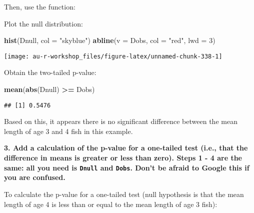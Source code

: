 \documentclass[]{book}
\newenvironment{Shaded}{\begin{snugshade}}{\end{snugshade}}
\newcommand{\KeywordTok}[1]{\textcolor[rgb]{0.13,0.29,0.53}{\textbf{#1}}}
\newcommand{\DataTypeTok}[1]{\textcolor[rgb]{0.13,0.29,0.53}{#1}}
\newcommand{\DecValTok}[1]{\textcolor[rgb]{0.00,0.00,0.81}{#1}}
\newcommand{\StringTok}[1]{\textcolor[rgb]{0.31,0.60,0.02}{#1}}
\newcommand{\OperatorTok}[1]{\textcolor[rgb]{0.81,0.36,0.00}{\textbf{#1}}}
\newcommand{\NormalTok}[1]{#1}
\theoremstyle{definition}
\theoremstyle{definition}
\theoremstyle{definition}
\theoremstyle{remark}
\begin{document}
Then, use the function:

\begin{Shaded}
\end{Shaded}

Plot the null distribution:

\begin{Shaded}
\begin{Highlighting}[]
\KeywordTok{hist}\NormalTok{(Dnull, }\DataTypeTok{col =} \StringTok{"skyblue"}\NormalTok{)}
\KeywordTok{abline}\NormalTok{(}\DataTypeTok{v =}\NormalTok{ Dobs, }\DataTypeTok{col =} \StringTok{"red"}\NormalTok{, }\DataTypeTok{lwd =} \DecValTok{3}\NormalTok{)}
\end{Highlighting}
\end{Shaded}

\begin{center}\texttt{[image: au-r-workshop\_files/figure-latex/unnamed-chunk-338-1]} \end{center}

Obtain the two-tailed p-value:

\begin{Shaded}
\begin{Highlighting}[]
\KeywordTok{mean}\NormalTok{(}\KeywordTok{abs}\NormalTok{(Dnull) }\OperatorTok{>=}\StringTok{ }\NormalTok{Dobs)}
\end{Highlighting}
\end{Shaded}

\begin{verbatim}
## [1] 0.5476
\end{verbatim}

Based on this, it appears there is no significant difference between the
mean length of age 3 and 4 fish in this example.

\textbf{3. Add a calculation of the p-value for a one-tailed test (i.e.,
that the difference in means is greater or less than zero). Steps 1 - 4
are the same: all you need is \texttt{Dnull} and \texttt{Dobs}. Don't be
afraid to Google this if you are confused.}

To calculate the p-value for a one-tailed test (null hypothesis is that
the mean length of age 4 is less than or equal to the mean length of age
3 fish):
\end{document}
